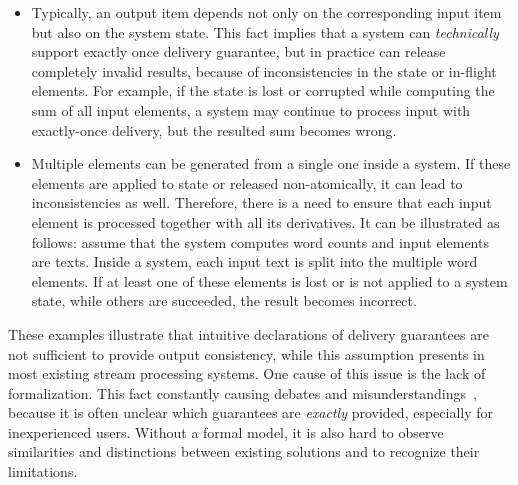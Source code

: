 \begin{itemize}
    \item Typically, an output item depends not only on the corresponding input item but also on the system state. This fact implies that a system can {\em technically} support exactly once delivery guarantee, but in practice can release completely invalid results, because of inconsistencies in the state or in-flight elements. For example, if the state is lost or corrupted while computing the sum of all input elements, a system may continue to process input with exactly-once delivery, but the resulted sum becomes wrong. 
    \item Multiple elements can be generated from a single one inside a system. If these elements are applied to state or released non-atomically, it can lead to inconsistencies as well. Therefore, there is a need to ensure that each input element is processed together with all its derivatives. It can be illustrated as follows: assume that the system computes word counts and input elements are texts. Inside a system, each input text is split into the multiple word elements. If at least one of these elements is lost or is not applied to a system state, while others are succeeded, the result becomes incorrect. 
\end{itemize}

These examples illustrate that intuitive declarations of delivery guarantees are not sufficient to provide output consistency, while this assumption presents in most existing stream processing systems. One cause of this issue is the lack of formalization. This fact constantly causing debates and misunderstandings~\cite{JerryPengStreamIO, PaperTrail}, because it is often unclear which guarantees are {\em exactly} provided, especially for inexperienced users. Without a formal model, it is also hard to observe similarities and distinctions between existing solutions and to recognize their limitations.

